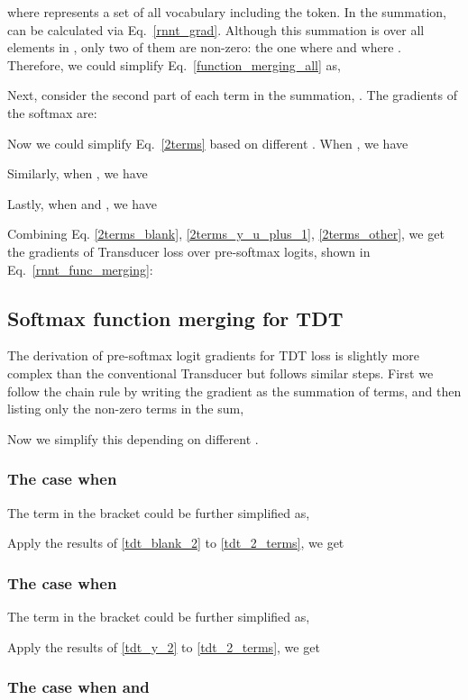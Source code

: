 \documentclass{article}
\begin{document}
where  represents a set of all vocabulary including the  token.
In the summation,  can be calculated via Eq.~\ref{rnnt_grad}. Although this summation is over all elements in , only two of them are non-zero: the one where  and where . Therefore, we could simplify Eq.~\ref{function_merging_all} as, 

Next, consider the second part of each term in the summation,  . The gradients of the softmax   are:

Now we could simplify Eq.~\ref{2terms} based on different . When , we have

Similarly, when , we have

Lastly, when  and , we have

Combining Eq. \ref{2terms_blank}, \ref{2terms_y_u_plus_1}, \ref{2terms_other}, we get the gradients of Transducer loss over pre-softmax logits, shown in Eq.~\ref{rnnt_func_merging}:


\subsection{Softmax function merging for TDT}
The derivation of pre-softmax logit gradients for TDT loss is slightly more complex than the conventional Transducer but follows similar steps. First we follow the chain rule by writing the gradient as the summation of terms, and then listing only the  non-zero terms in the sum,

Now we simplify this depending on different . 
\subsubsection{The case when }

The term in the bracket could be further simplified as,

Apply the results of \ref{tdt_blank_2} to \ref{tdt_2_terms}, we get








\subsubsection{The case when }

The term in the bracket could be further simplified as,

Apply the results of \ref{tdt_y_2} to \ref{tdt_2_terms}, we get


\subsubsection{The case when  and }
\end{document}

